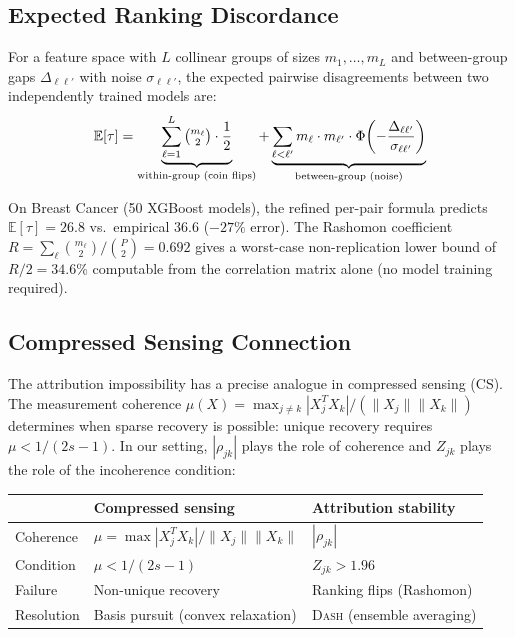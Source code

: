 \documentclass{jmlr}
\newcommand{\E}{\mathbb{E}}
\newcommand{\DASH}{\textsc{Dash}}
\begin{document}
\subsection{Expected Ranking Discordance}

\begin{proposition}
\label{prop:kendall-tau}
For a feature space with $L$ collinear groups of sizes $m_1, \ldots, m_L$ and between-group gaps $\Delta_{\ell\ell'}$ with noise $\sigma_{\ell\ell'}$, the expected pairwise disagreements between two independently trained models are:
\[
    \E[\tau] = \underbrace{\sum_{\ell=1}^{L} \tbinom{m_\ell}{2} \cdot \frac{1}{2}}_{\text{within-group (coin flips)}} + \underbrace{\sum_{\ell < \ell'} m_\ell \cdot m_{\ell'} \cdot \Phi\!\left(-\frac{\Delta_{\ell\ell'}}{\sigma_{\ell\ell'}}\right)}_{\text{between-group (noise)}}
\]
\end{proposition}

On Breast Cancer (50 XGBoost models), the refined per-pair formula predicts $\E[\tau] = 26.8$ vs.\ empirical $36.6$ ($-27\%$ error). The Rashomon coefficient $R = \sum_\ell \binom{m_\ell}{2}/\binom{P}{2} = 0.692$ gives a worst-case non-replication lower bound of $R/2 = 34.6\%$ computable from the correlation matrix alone (no model training required).

\subsection{Compressed Sensing Connection}

The attribution impossibility has a precise analogue in compressed sensing (CS). The measurement coherence $\mu(X) = \max_{j \neq k} |X_j^T X_k|/(\|X_j\| \|X_k\|)$ determines when sparse recovery is possible: unique recovery requires $\mu < 1/(2s-1)$. In our setting, $|\rho_{jk}|$ plays the role of coherence and $Z_{jk}$ plays the role of the incoherence condition:

\begin{center}
\small
\begin{tabular}{@{}lll@{}}
\toprule
& \textbf{Compressed sensing} & \textbf{Attribution stability} \\
\midrule
Coherence & $\mu = \max |X_j^T X_k|/\|X_j\|\|X_k\|$ & $|\rho_{jk}|$ \\
Condition & $\mu < 1/(2s{-}1)$ & $Z_{jk} > 1.96$ \\
Failure & Non-unique recovery & Ranking flips (Rashomon) \\
Resolution & Basis pursuit (convex relaxation) & \DASH{} (ensemble averaging) \\
\bottomrule
\end{tabular}
\end{center}
\end{document}
